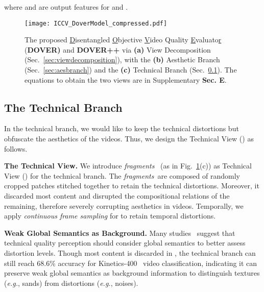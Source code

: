 \documentclass[10pt,twocolumn,letterpaper]{article}
\renewcommand{\paragraph}[1]{\noindent \textbf{#1}}
\newcommand{\frag}[0]{{{\textit{fragments}}}}
\begin{document}
where  and  are output features for  and .

\begin{figure}    
\centering
   \texttt{[image: ICCV\_DoverModel\_compressed.pdf]}
   \vspace{-6pt}
    \caption{The proposed \underline{D}isentangled \underline{O}bjective \underline{V}ideo Quality \underline{E}valuato\underline{r} (\textbf{DOVER)} and \textbf{DOVER++} via \textbf{(a)} View Decomposition (Sec.~\ref{sec:viewdecomposition}), with the \textbf{(b)} Aesthetic Branch (Sec.~\ref{sec:aesbranch}) and the \textbf{(c)} Technical Branch (Sec.~\ref{sec:tecbranch}). The equations to obtain the two views are in Supplementary \textbf{Sec. E}.} \label{fig:dover_model}
   \vspace{-16pt}
\end{figure}

\subsection{The Technical Branch}
\label{sec:tecbranch}
In the technical branch, we would like to keep the technical distortions but obfuscate the aesthetics of the videos. Thus, we design the Technical View () as follows.

\paragraph{The Technical View.} We introduce \frag~\cite{fastvqa} (as in Fig.~\ref{fig:dover_model}(c)) as Technical View () for the technical branch. The \frag~are composed of randomly cropped patches stitched together to retain the technical distortions. Moreover, it discarded most content and disrupted the compositional relations of the remaining, therefore severely corrupting aesthetics in videos.
Temporally, we apply \textit{continuous frame sampling} for  to retain temporal distortions.

\begin{comment}

where  denote positions of cropped patches,  is the number of grids where patches are cropped, and  denotes cropping a patch sized . 
\end{comment}

\paragraph{Weak Global Semantics as Background.} Many studies~\cite{dbcnn,fastvqa,fastervqa} suggest that technical quality perception should consider global semantics to better assess distortion levels. Though most content is discarded in , the technical branch can still reach 68.6\% accuracy for Kinetics-400~\cite{k400data} video classification, indicating it can preserve weak global semantics as background information to distinguish textures (\textit{e.g.}, sands) from distortions (\textit{e.g.}, noises).
\end{document}
